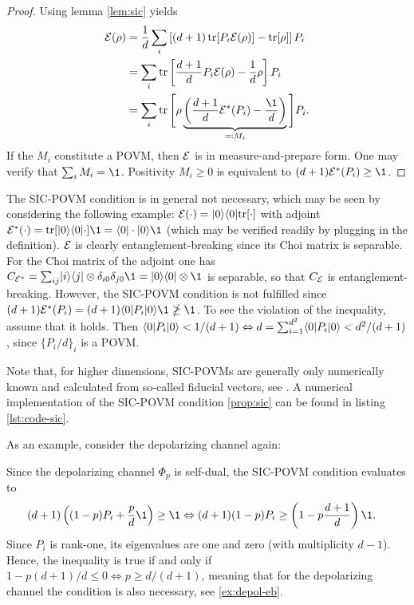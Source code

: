 \begin{proof}
    Using lemma \ref{lem:sic} yields
    \begin{align*}
\mathcal{E}(\rho) &= \frac{1}{d} \sum_i \left[ (d+1) \operatorname{tr}[P_i \mathcal{E}(\rho)] - \operatorname{tr}[\rho] \right] P_i \\
&= \sum_i \operatorname{tr} \left[ \frac{d+1}{d} P_i \mathcal{E}(\rho) - \frac{1}{d} \rho \right] P_i \\
&= \sum_i \operatorname{tr} \Bigg[ \rho \underbrace{\left( \frac{d+1}{d} \mathcal{E}^*(P_i) - \frac{\1}{d} \right)}_{\eqqcolon M_i}\Bigg] P_i.
\end{align*}
If the $M_i$ constitute a POVM, then $\mathcal E$ is in measure-and-prepare form. One may verify that $\sum_i M_i = \1$. Positivity $M_i \geq 0$ is equivalent to $(d+1)\m E^*(P_i) \geq \1$.
\end{proof}

The SIC-POVM condition is in general not necessary, which may be seen by considering the following example: $\mathcal E (\cdot) = \lvert0\rangle\langle0\rvert \mathrm{tr[\cdot]}$ with adjoint $\m E^*(\cdot) = \trr{\pr {0} \cdot}\1 = \bra{0}\cdot \ket{0}\1$ (which may be verified readily by plugging in the definition). $\mathcal E$ is clearly entanglement-breaking since its Choi matrix is separable. For the Choi matrix of the adjoint one has $C_{\m E^*} = \sum_{ij}\ket{i}\bra{j} \otimes \delta_{i0}\delta_{j0}\1 = \pr 0 \otimes \1$ is separable, so that $C_{\mathcal E}$ is entanglement-breaking. However, the SIC-POVM condition is not fulfilled since $(d+1)\m E^*(P_i) = (d+1)\bra 0 P_i \ket 0 \1 \ngeq \1$. To see the violation of the inequality, assume that it holds. Then $\langle0\rvert P_i \lvert0\rangle < 1/(d+1) \Leftrightarrow  d = \sum_{i=1}^{d^2}\langle0\rvert P_i \lvert0\rangle < d^2/(d+1)$, since $\{P_i/d\}_i$ is a POVM.

Note that, for higher dimensions, SIC-POVMs are generally only numerically known and calculated from so-called fiducial vectors, see \cite{Scott2010, Fuchs2017}. A numerical implementation of the SIC-POVM condition \ref{prop:sic} can be found in listing \ref{lst:code-sic}. 

As an example, consider the depolarizing channel again:
\begin{ex}
Since the depolarizing channel $\Phi_p$ is self-dual, the SIC-POVM condition evaluates to
\begin{align*}
    (d+1)\left( (1-p)P_i + \frac{p}{d}\1 \right) &\geq \1 \Leftrightarrow (d+1)(1-p)P_i \geq  \left(1-p\frac{d+1}{d}\right)\1.
\end{align*}
Since $P_i$ is rank-one, its eigenvalues are one and zero (with multiplicity $d-1$). Hence, the inequality is true if and only if $1-p(d+1)/d \leq 0 \Leftrightarrow p \geq d/(d+1)$, meaning that for the depolarizing channel the condition is also necessary, see \ref{ex:depol-eb}.
\end{ex}



